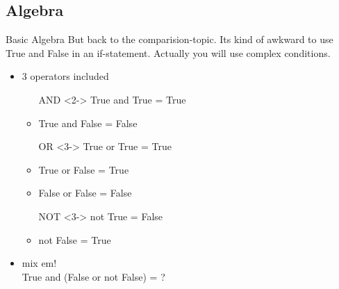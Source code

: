 \documentclass[hyperref={pdfpagelabels=false}]{beamer}
\begin{document}
    \subsection{Algebra}
		\begin{frame}{Basic Algebra}
            But back to the comparision-topic. Its kind of awkward to use True and False in an if-statement.
            Actually you will use complex conditions.
			\begin{itemize}
                \item<1-> 3 operators included
                \begin{itemize}
                    \item[AND]<2-> True and True = True
                    \item<2-> True and False = False
                    \item[OR]<3-> True or True = True
                    \item<3-> True or False = True
                    \item<3-> False or False = False
                    \item[NOT]<3-> not True = False
                    \item<3-> not False = True
                \end{itemize}
                \item<4-> mix em! \\
                        True and (False or not False) = ?
            \end{itemize}
        \end{frame}    
\end{document}
